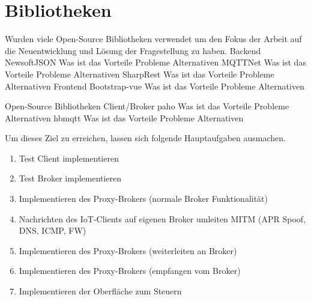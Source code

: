 \section{Bibliotheken}
    Wurden viele Open-Source Bibliotheken verwendet um den Fokus der Arbeit auf die Neuentwicklung und Lösung der Fragestellung zu haben.
    Backend
        NewsoftJSON
            Was ist das
            Vorteile
            Probleme
            Alternativen
        MQTTNet
            Was ist das
            Vorteile
            Probleme
            Alternativen
        SharpRest
            Was ist das
            Vorteile
            Probleme
            Alternativen
    Frontend
        Bootstrap-vue
            Was ist das
            Vorteile
            Probleme
            Alternativen
            
    Open-Source Bibliotheken Client/Broker
        paho
            Was ist das
            Vorteile
            Probleme
            Alternativen
        hbmqtt
            Was ist das
            Vorteile
            Probleme
            Alternativen
        
Um dieses Ziel zu erreichen, lassen sich folgende Hauptaufgaben ausmachen.
\begin{enumerate}
    \item Test Client implementieren
    \item Test Broker implementieren
    \item Implementieren des Proxy-Brokers (normale Broker Funktionalität)
    \item Nachrichten des IoT-Clients auf eigenen Broker umleiten
        MITM (APR Spoof, DNS, ICMP, FW)
    \item Implementieren des Proxy-Brokers (weiterleiten an Broker)
    \item Implementieren des Proxy-Brokers (empfangen vom Broker)
    \item Implementieren der Oberfläche zum Steuern
\end{enumerate}